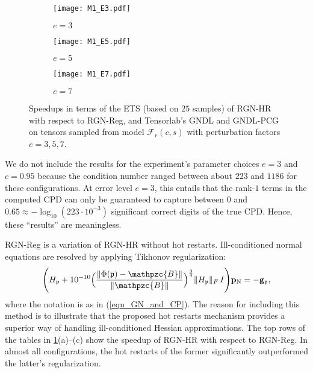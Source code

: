 \documentclass[a4paper,10pt,final]{siamart1116}
\newcommand{\tuple}[1]{\mathfrak{#1}}
\newcommand{\Var}[1]{\mathcal{#1}}
\newcommand{\tensor}[1]{\mathpzc{#1}}
\newcommand{\vect}[1]{\mathbf{#1}}
\newcommand{\refeqn}[1]{{(\ref{#1})}}
\newcommand{\reffig}[1]{{\cref{#1}}}
\numberwithin{equation}{section}
\numberwithin{figure}{section}
\numberwithin{table}{section}
\numberwithin{theorem}{section}
\begin{document}
\begin{figure}[p] \centering\small
\vspace{-1em}
\begin{subfigure}{\textwidth}
\texttt{[image: M1\_E3.pdf]}
\caption{$e = 3$}
\end{subfigure}

\begin{subfigure}{\textwidth}
\texttt{[image: M1\_E5.pdf]}
\caption{$e = 5$}
\end{subfigure}

\begin{subfigure}{\textwidth}
\texttt{[image: M1\_E7.pdf]}
\caption{$e = 7$}
\end{subfigure}

\caption{Speedups in terms of the ETS (based on $25$ samples) of RGN-HR with respect to RGN-Reg, and Tensorlab's GNDL and GNDL-PCG on tensors sampled from model $\Var{F}_{r}(c,s)$ with perturbation factors $e = 3, 5, 7$.} \label{fig_model1}
\end{figure}

We do not include the results for the experiment's parameter choices $e = 3$ and $c = 0.95$ because the condition number ranged between about $223$ and $1186$ for these configurations. At error level $e = 3$, this entails that the rank-$1$ terms in the computed CPD can only be guaranteed to capture between $0$ and $0.65 \approx -\log_{10}(223 \cdot 10^{-3})$ significant correct digits of the true CPD. Hence, these ``results'' are meaningless.


RGN-Reg is a variation of RGN-HR without hot restarts. Ill-conditioned normal equations are resolved by applying Tikhonov regularization:
\[
 \Biggl(H_{\tuple{p}} + 10^{-10} \Bigl(\frac{\|\Phi(\tuple{p}) - \tensor{B}\|}{\|\tensor{B}\|} \Bigr)^{\frac{3}{4}} \| H_{\tuple{p}} \|_F \, I \Biggr) \vect{p}_{\text N} = - \vect{g}_{\tuple{p}},
\]
where the notation is as in \refeqn{eqn_GN_and_CP}.
The reason for including this method is to illustrate that the proposed hot restarts mechanism provides a superior way of handling ill-conditioned Hessian approximations. The top rows of the tables in \reffig{fig_model1}(a)--(c) show the speedup of RGN-HR with respect to RGN-Reg. In almost all configurations, the hot restarts of the former significantly outperformed the latter's regularization.
\end{document}
